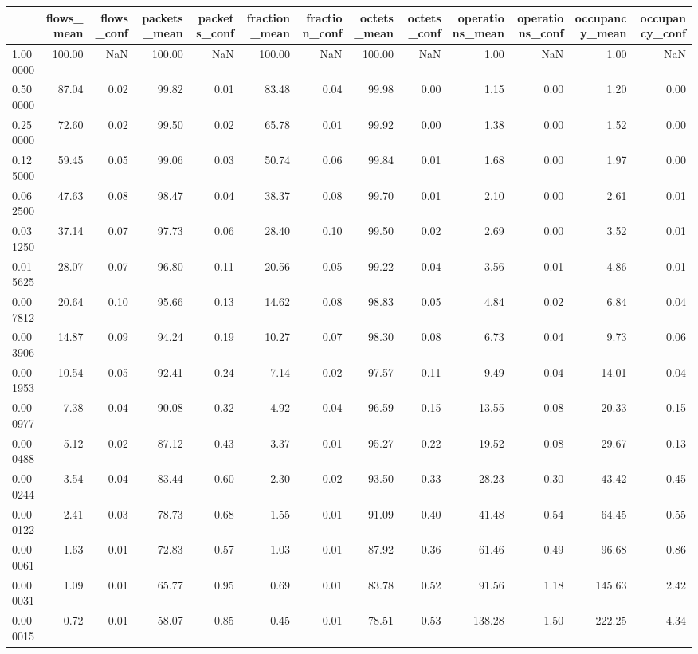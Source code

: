 \begin{tabular}{lrrrrrrrrrrrr}
\toprule
 & flows_mean & flows_conf & packets_mean & packets_conf & fraction_mean & fraction_conf & octets_mean & octets_conf & operations_mean & operations_conf & occupancy_mean & occupancy_conf \\
\midrule
1.000000 & 100.00 & NaN & 100.00 & NaN & 100.00 & NaN & 100.00 & NaN & 1.00 & NaN & 1.00 & NaN \\
0.500000 & 87.04 & 0.02 & 99.82 & 0.01 & 83.48 & 0.04 & 99.98 & 0.00 & 1.15 & 0.00 & 1.20 & 0.00 \\
0.250000 & 72.60 & 0.02 & 99.50 & 0.02 & 65.78 & 0.01 & 99.92 & 0.00 & 1.38 & 0.00 & 1.52 & 0.00 \\
0.125000 & 59.45 & 0.05 & 99.06 & 0.03 & 50.74 & 0.06 & 99.84 & 0.01 & 1.68 & 0.00 & 1.97 & 0.00 \\
0.062500 & 47.63 & 0.08 & 98.47 & 0.04 & 38.37 & 0.08 & 99.70 & 0.01 & 2.10 & 0.00 & 2.61 & 0.01 \\
0.031250 & 37.14 & 0.07 & 97.73 & 0.06 & 28.40 & 0.10 & 99.50 & 0.02 & 2.69 & 0.00 & 3.52 & 0.01 \\
0.015625 & 28.07 & 0.07 & 96.80 & 0.11 & 20.56 & 0.05 & 99.22 & 0.04 & 3.56 & 0.01 & 4.86 & 0.01 \\
0.007812 & 20.64 & 0.10 & 95.66 & 0.13 & 14.62 & 0.08 & 98.83 & 0.05 & 4.84 & 0.02 & 6.84 & 0.04 \\
0.003906 & 14.87 & 0.09 & 94.24 & 0.19 & 10.27 & 0.07 & 98.30 & 0.08 & 6.73 & 0.04 & 9.73 & 0.06 \\
0.001953 & 10.54 & 0.05 & 92.41 & 0.24 & 7.14 & 0.02 & 97.57 & 0.11 & 9.49 & 0.04 & 14.01 & 0.04 \\
0.000977 & 7.38 & 0.04 & 90.08 & 0.32 & 4.92 & 0.04 & 96.59 & 0.15 & 13.55 & 0.08 & 20.33 & 0.15 \\
0.000488 & 5.12 & 0.02 & 87.12 & 0.43 & 3.37 & 0.01 & 95.27 & 0.22 & 19.52 & 0.08 & 29.67 & 0.13 \\
0.000244 & 3.54 & 0.04 & 83.44 & 0.60 & 2.30 & 0.02 & 93.50 & 0.33 & 28.23 & 0.30 & 43.42 & 0.45 \\
0.000122 & 2.41 & 0.03 & 78.73 & 0.68 & 1.55 & 0.01 & 91.09 & 0.40 & 41.48 & 0.54 & 64.45 & 0.55 \\
0.000061 & 1.63 & 0.01 & 72.83 & 0.57 & 1.03 & 0.01 & 87.92 & 0.36 & 61.46 & 0.49 & 96.68 & 0.86 \\
0.000031 & 1.09 & 0.01 & 65.77 & 0.95 & 0.69 & 0.01 & 83.78 & 0.52 & 91.56 & 1.18 & 145.63 & 2.42 \\
0.000015 & 0.72 & 0.01 & 58.07 & 0.85 & 0.45 & 0.01 & 78.51 & 0.53 & 138.28 & 1.50 & 222.25 & 4.34 \\

\end{tabular}
